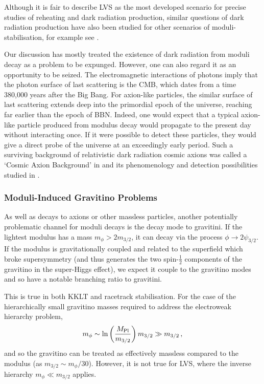 Although it is fair to describe LVS as the most developed scenario for precise studies of reheating and dark radiation production, similar questions of dark radiation production have also been studied for other scenarios of moduli-stabilisation, for example see \cite{ 13047987, 14072501, 150207746, 151207907,  190603025, 210803317, Baer:2023bbn}.

Our discussion has mostly treated the existence of dark radiation from moduli decay as a problem to be expunged. However, one can also regard it as an opportunity to be seized. The electromagnetic interactions of photons imply that the photon surface of last scattering is the CMB, which dates from a time 380,000 years after the Big Bang. For axion-like particles, the similar surface of last scattering extends deep into the primordial epoch of the universe, reaching far earlier than the epoch of BBN. Indeed, one would expect that a typical axion-like particle produced from modulus decay would propagate to the present day without interacting once. If it were possible to detect these particles, they would give a direct probe of the universe at an exceedingly early period. Such a surviving background of relativistic dark radiation cosmic axions was called a `Cosmic Axion Background' in \cite{13053603} and its phenomenology and detection possibilities studied in 
 \cite{13066518, 13104464, 13123947, 14065188, 14072501, 14114172, 150605334, 160208433, 210703420, Bhattacharya:2020zap, Banerjee:2022era}.

\subsubsection{Moduli-Induced Gravitino Problems}

As well as decays to axions or other massless particles, another potentially problematic channel for moduli decays is the decay mode to gravitini. If the lightest modulus has a mass $m_\phi > 2 m_{3/2}$, it can decay via the process $\phi \to 2 \psi_{3/2}$. If the modulus is gravitationally coupled and related to the superfield which broke supersymmetry (and thus generates the two spin-$\frac12$ components of the gravitino in the super-Higgs effect), we expect it couple to the gravitino modes and so have a notable branching ratio to gravitini. 

This is true in both KKLT and racetrack stabilisation. For the case of the hierarchically small gravitino masses required to address
the electroweak hierarchy problem,
\begin{equation}
m_\phi \sim \ln \left( \frac{M_{\rm Pl}}{m_{3/2}} \right) m_{3/2} \gg m_{3/2}\,,
\end{equation}
and so the gravitino can be treated as effectively massless compared to the modulus (as $m_{3/2} \sim m_\phi/30$). However, it is not true for LVS, where the inverse hierarchy $m_\phi \ll m_{3/2}$ applies.

